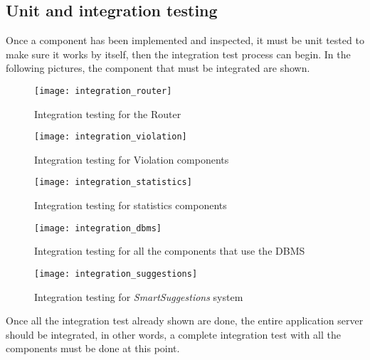 \subsection{Unit and integration testing}
Once a component has been implemented and inspected, it must be unit tested to
make sure it works by itself, then the integration test process can begin.
In the following pictures, the component that must be integrated are shown.

\begin{figure}[h]
    \centering
    \texttt{[image: integration\_router]}
    \caption{Integration testing for the Router}
    \label{fig:integration_router}
\end{figure}

\begin{figure}[h]
    \centering
    \texttt{[image: integration\_violation]}
    \caption{Integration testing for Violation components}
    \label{fig:integration_violation}
\end{figure}

\begin{figure}[h]
    \centering
    \texttt{[image: integration\_statistics]}
    \caption{Integration testing for statistics components}
    \label{fig:integration_statistics}
\end{figure}

\begin{figure}[h]
    \centering
    \texttt{[image: integration\_dbms]}
    \caption{Integration testing for all the components that use the DBMS}
    \label{fig:integration_dbms}
\end{figure}
\clearpage
\begin{figure}[h]
    \centering
    \texttt{[image: integration\_suggestions]}
    \caption{Integration testing for \emph{SmartSuggestions} system}
    \label{fig:integration_suggestions}
\end{figure}

Once all the integration test already shown are done, the entire application
server should be integrated, in other words, a complete integration test with
all the components must be done at this point.